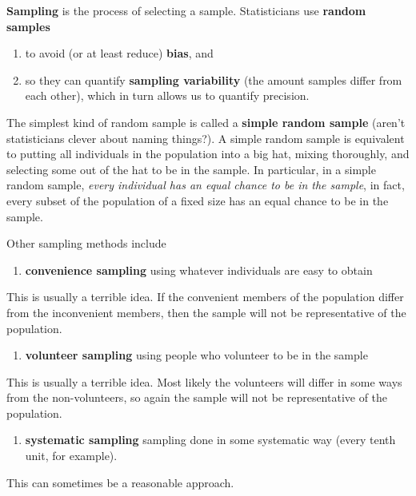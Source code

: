 \documentclass[]{book}
\providecommand{\tightlist}{%
  \setlength{\itemsep}{0pt}\setlength{\parskip}{0pt}}
\begin{document}
\textbf{Sampling} is the process of selecting a sample. Statisticians use \textbf{random samples}

\begin{enumerate}
\tightlist
\item
  to avoid (or at least reduce) \textbf{bias}, and
\item
  so they can quantify \textbf{sampling variability} (the amount samples differ from each other), which in turn allows us to quantify precision.
\end{enumerate}

The simplest kind of random sample is called a \textbf{simple random sample} (aren't statisticians clever about naming things?). A simple random sample is equivalent to putting all individuals in the population into a big hat, mixing thoroughly, and selecting some out of the hat to be in the sample. In particular, in a simple random sample, \emph{every individual has an equal chance to be in the sample}, in fact, every subset of the population of a fixed size has an equal chance to be in the sample.

Other sampling methods include

\begin{enumerate}
\tightlist
\item
  \textbf{convenience sampling} using whatever individuals are easy to obtain
\end{enumerate}

This is usually a terrible idea. If the convenient members of the population differ from the inconvenient members, then the sample will not be representative of the population.

\begin{enumerate}
\tightlist
\item
  \textbf{volunteer sampling} using people who volunteer to be in the sample
\end{enumerate}

This is usually a terrible idea. Most likely the volunteers will differ in some ways from the non-volunteers, so again the sample will not be representative of the population.

\begin{enumerate}
\tightlist
\item
  \textbf{systematic sampling} sampling done in some systematic way
  (every tenth unit, for example).
\end{enumerate}

This can sometimes be a reasonable approach.
\end{document}
